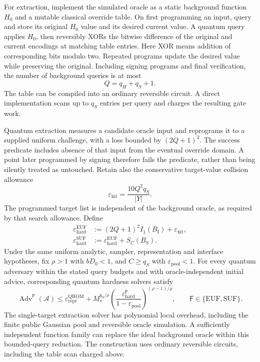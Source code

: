 \documentclass[11pt,a4paper]{article}
\newcommand{\eps}{\varepsilon}
\theoremstyle{definition}
\theoremstyle{remark}
\numberwithin{equation}{section}
\begin{document}
For extraction, implement the simulated oracle as a static background
function $H_0$ and a mutable classical override table. On first programming
an input, query and store its original $H_0$ value and its desired current
value. A quantum query applies $H_0$, then reversibly XORs the bitwise
difference of the original and current encodings at matching table entries.
Here XOR means addition of corresponding bits modulo two.
Repeated programs update the desired value while preserving the original.
Including signing programs and final verification, the number of background
queries is at most
\begin{equation}
 Q=q_H+q_S+1.
\end{equation}
The table can be compiled into an ordinary reversible circuit. A direct
implementation scans up to $q_S$ entries per query and charges the resulting
gate work.

Quantum extraction measures a candidate oracle input and reprograms it
to a supplied uniform challenge, with a loss bounded by $(2Q+1)^2$.
The success predicate includes absence of that input from the eventual
override domain. A point later programmed by signing therefore fails the
predicate, rather than being silently treated as untouched. Retain also
the conservative target-value collision allowance
\begin{equation}
 \eps_{\mathrm{hit}}=\frac{10Q^2q_S}{|Y|}.
\end{equation}
The programmed target list is independent of the background oracle, as
required by that search allowance. Define
\begin{align}
 \eps_{\mathrm{hard}}^{\mathrm{EUF}}
   &:=(2Q+1)^2I_1(B_{\mathrm I})+\eps_{\mathrm{hit}},\\
 \eps_{\mathrm{hard}}^{\mathrm{SUF}}
   &:=\eps_{\mathrm{hard}}^{\mathrm{EUF}}+S_C(B_{\mathrm S}).
\end{align}
Under the same uniform analytic, sampler, representation and interface
hypotheses, fix $\rho>1$ with $bD_0<1$, and $C\ge q_S$ with
$\eps_{\mathrm{pool}}<1$. For every quantum adversary within the stated
query budgets and with oracle-independent initial advice, corresponding
quantum hardness solvers satisfy
\begin{equation}
 \operatorname{Adv}^{\mathsf F}(\mathcal A)
 \le\eps_{\mathrm{repr}}^{\mathrm{QROM}}+
 M_*^{q_S/\rho}
 \left(\frac{\eps_{\mathrm{hard}}^{\mathsf F}}
 {1-\eps_{\mathrm{pool}}}\right)^{(\rho-1)/\rho},
 \qquad\mathsf F\in\{\mathrm{EUF},\mathrm{SUF}\}.
 \label{eq:complete-qrom-security}
\end{equation}
The single-target extraction solver has polynomial local overhead,
including the finite public Gaussian pool and reversible oracle simulation.
A sufficiently independent function family can replace the ideal background
oracle within this bounded-query reduction. The construction uses ordinary
reversible circuits, including the table scan charged above.
\end{document}
